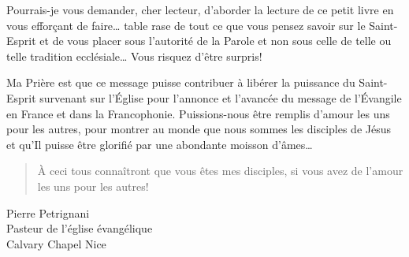 {Pourrais-je vous demander, cher lecteur, d'aborder la lecture de ce petit livre en vous efforçant de faire\dots{}
 table rase de tout ce que vous pensez savoir sur le Saint-Esprit et de vous placer sous l'autorité de la Parole
 et non sous celle de telle ou telle tradition ecclésiale\dots{} Vous risquez d'être surpris!

Ma Prière est que ce message puisse contribuer à libérer \Og la puissance du Saint-Esprit survenant sur l'\'Eglise \Fg{}
 pour l'annonce et l'avancée du message de l'\'Evangile en France et dans la Francophonie.
 Puissions-nous être remplis d'amour les uns pour les autres,
 pour montrer au monde que nous sommes les disciples de Jésus
 et qu'Il puisse être glorifié par une abondante moisson d'âmes\dots{}

\begin{quote}
\Og \`A ceci tous connaîtront que vous êtes mes disciples,
 si vous avez de l'amour les uns pour les autres! \Fg{}
\end{quote}

\begin{flushright}
Pierre Petrignani\\
Pasteur de l'église évangélique\\
\Og Calvary Chapel Nice \Fg
\end{flushright}

}
\closechapter[prefaceend]


